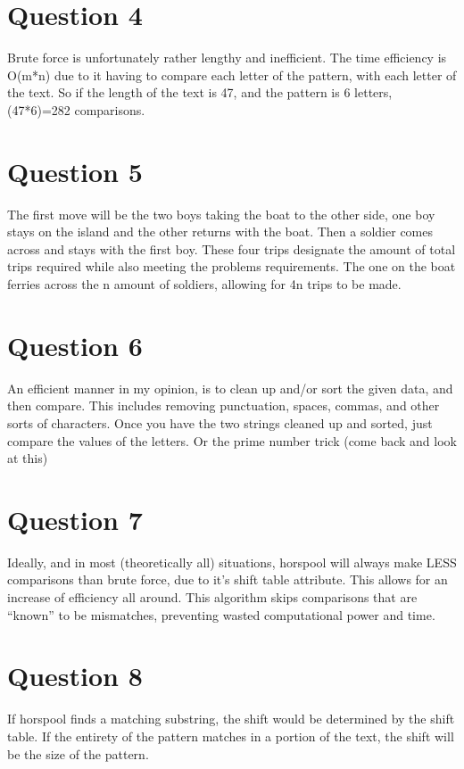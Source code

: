 \documentclass[11pt]{article} %
\begin{document}
\section {Question 4}

	Brute force is unfortunately rather lengthy and inefficient. The time efficiency is O(m*n) due to it having to compare each letter of the pattern, with each letter of the text. So if the length of the text is 47, and the pattern is 6 letters, (47*6)=282 comparisons.

\section {Question 5}

	The first move will be the two boys taking the boat to the other side, one boy stays on the island and the other returns with the boat. Then a soldier comes across and stays with the first boy. These four trips designate the amount of total trips required while also meeting the problems requirements. The one on the boat ferries across the n amount of soldiers, allowing for 4n trips to be made.

\section {Question 6}

	An efficient manner in my opinion, is to clean up and/or sort the given data, and then compare. This includes removing punctuation, spaces, commas, and other sorts of characters. Once you have the two strings cleaned up and sorted, just compare the values of the letters. 
	Or the prime number trick (come back and look at this)


\section {Question 7}

	Ideally, and in most (theoretically all) situations, horspool will always make LESS comparisons than brute force, due to it’s shift table attribute. This allows for an increase of efficiency all around. This algorithm skips comparisons that are “known” to be mismatches, preventing wasted computational power and time.

\section {Question 8}
	
	If horspool finds a matching substring, the shift would be determined by the shift table. If the entirety of the pattern matches in a portion of the text, the shift will be the size of the pattern. 
\end{document}
